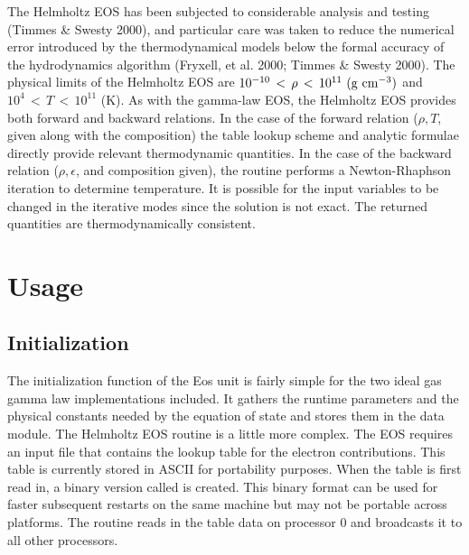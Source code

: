 The Helmholtz EOS has been subjected to considerable analysis and
testing (Timmes \& Swesty 2000), and particular care was taken to
reduce the numerical error introduced by the thermodynamical models
below the formal accuracy of the hydrodynamics algorithm (Fryxell,
et al. 2000; Timmes \& Swesty 2000).  The physical limits of the
Helmholtz EOS are $10^{-10}\,<\,\rho\,<\,10^{11}~({\rm g~cm}^{-3})$
and $10^{4}\,<\,T\,<\,10^{11}$ (K).  As with the gamma-law EOS, the
Helmholtz EOS provides both forward and backward relations. In the
case of the forward relation ($\rho, T$, given along with the
composition) the table lookup scheme and analytic formulae directly
provide relevant thermodynamic quantities. In the case of the
backward relation ($\rho, \epsilon$, and composition given), the
routine performs a Newton-Rhaphson iteration to determine
temperature.  It is possible for the input variables to be
changed in the iterative modes since the solution is not exact.
The returned quantities are thermodynamically consistent.


\section{Usage}
\label{Sec:Eos Usage}

\subsection{Initialization}
\label{Sec:Eos Initialization}
The initialization function of the Eos unit
 is fairly simple for the two ideal gas
gamma law implementations included. It gathers the runtime parameters
and the physical constants needed by the equation of state and stores
them in the data module.
The Helmholtz EOS  routine is a little more
complex. The  EOS requires an input file
 that contains the lookup table for the electron
contributions.  This table is currently stored in ASCII for portability
purposes.  When the table is first read in, a binary version called
 is created.  This binary format can be used for
faster subsequent
restarts on the same machine but may not be portable across
platforms. The  routine reads in the table data on processor 0 and
broadcasts it to all other processors.

